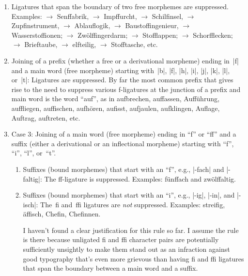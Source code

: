 \documentclass[11pt]{article}
\begin{document}
\begin{enumerate}
\item Ligatures that span the boundary of two free morphemes are suppressed. Examples: 
 $\to$ Senffabrik, 
 $\to$ Impffurcht, 
 $\to$ Schilfinsel, 
 $\to$ Zupfinstrument, 
 $\to$ Ablauflogik,  
 $\to$ Baustoffingenieur,
 $\to$ Wasserstoffionen; 
 $\to$ Zwölffingerdarm; 
 $\to$ Stofflappen;
 $\to$ Schorfflecken; 
 $\to$ Brieftaube, 
 $\to$ elfteilig, 
 $\to$ Stofftasche, 
etc.

\item Joining of a prefix (whether a free or a derivational morpheme) ending in~|f| and a main word (free morpheme) starting with~|b|, |f|, |h|, |i|, |j|, |k|, |l|, or~|t|: Ligatures are suppressed. By far the most common prefix that gives rise to the need to suppress various f-ligatures at the junction of a prefix and main word is the word \enquote{auf}, as in aufbrechen, auffassen, Aufführung, auffliegen, auffischen, aufhören, aufisst, aufjaulen, aufklingen, Auflage, Auftrag, auftreten, etc.

\item Case 3: Joining of a main word (free morpheme) ending in \enquote{f} or \enquote{ff} and a suffix (either a derivational or an inflectional morpheme) starting with \enquote{f}, \enquote{i}, \enquote{l}, or~\enquote{t}.

\begin{enumerate}
\item Suffixes (bound morphemes) that start with an \enquote{f}, e.g., |-fach| and |-faltig|: The ff-ligature is suppressed. Examples: fünffach and zwölffaltig. 

\item Suffixes (bound morphemes) that start with an \enquote{i}, e.g., |-ig|, |-in|, and |-isch|: The~fi and~ffi ligatures are \emph{not} suppressed. Examples: streifig, äffisch, Chefin, Chefinnen.

I haven't found a clear justification for this rule so far. I assume the rule is there because unligated f\breaklig i and ff\breaklig i character pairs are potentially sufficiently unsightly to make them stand out as an infraction against good typography that's even more grievous than having fi and ffi ligatures that span the boundary between a main word and a suffix.


\end{enumerate}
\end{enumerate}
\end{document}
